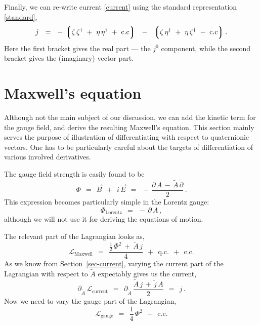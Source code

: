 \documentclass[epsfig,12pt]{article}
\newcommand{\cell}{{\mathcal L}}
\newcommand{\p}{\partial}
\newcommand{\wt}{\widetilde}
\newcommand{\lgr}{\left\lgroup}
\newcommand{\rgr}{\right\rgroup}
\begin{document}
	Finally, we can re-write current \eqref{current} using the standard representation \eqref{standard},
\begin{equation}
	j	~~=~~	-\, \lgr \zeta\,\zeta^\dag ~+~ \eta\,\eta^\dag ~+~ \text{c.c} \rgr  ~~-~~  
			\lgr \zeta\,\eta^\dag ~+~ \eta\,\zeta^\dag ~-~ \text{c.c} \rgr.
\end{equation}
	Here the first bracket gives the real part --- the $ j^0 $ component, while the second bracket gives
	the (imaginary) vector part.




\section{Maxwell's equation}
	Although not the main subject of our discussion, we can add the kinetic term for the gauge field,
	and derive the resulting Maxwell's equation.
	This section mainly serves the purpose of illustration of differentiating with respect to quaternionic vectors.
	One has to be particularly careful about the targets of differentiation of various involved derivatives.

	The gauge field strength is easily found to be
\begin{equation}
	\Phi	~~=~~	\vec B ~~+~~ i\,\vec E	~~=~~	-\, \frac{\p\,A \,-\, \wt A\,\wt\p} 2\,.
\end{equation}
	This expression becomes particularly simple in the Lorentz gauge:
\begin{equation}
	\Phi_\text{Lorentz}	~~=~~ -\, \p\, A\,,
\end{equation}
	although we will not use it for deriving the equations of motion.

	The relevant part of the Lagrangian looks as,
\begin{equation}
	\cell_\text{Maxwell}	~~=~~	\frac{ \frac 1 2\, \Phi^2 ~+~ \wt A\,j } 4  ~~+~~  \text{q.c.}  ~~+~~  \text{c.c.}
\end{equation}
	As we know from Section~\ref{sec-current}, varying the current part of the Lagrangian with respect to $ \wt A $
	expectably gives us the current,
\begin{equation}
	\p_{\wt A}\,\cell_\text{current}	~~=~~	\p_{\wt A}\, \frac{\wt A\,j \,+\, \wt j\, A} 2	~~=~~	j\,.
\end{equation}
	Now we need to vary the gauge part of the Lagrangian,
\begin{equation}
	\cell_\text{gauge}	~~=~~	\frac 1 4\, \Phi^2  ~~+~~  \text{c.c.}
\end{equation}
	
\end{document}
